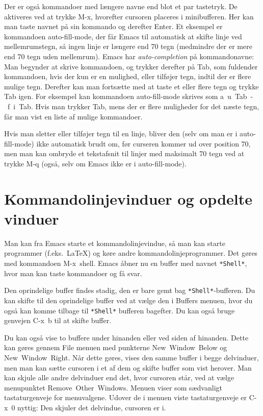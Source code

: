 \documentclass[a4paper]{article}
\begin{document}
Der er også kommandoer med længere navne end blot et par tastetryk.
De aktiveres ved at trykke \textsf{M-x}, hvorefter cursoren placeres i
minibufferen.  Her kan man taste navnet på sin kommando og derefter
\textsf{Enter}.  Et eksempel er kommandoen \textsf{auto-fill-mode},
der får Emacs til automatisk at skifte linje ved mellemrumstegn, så
ingen linje er længere end 70 tegn (medmindre der er mere end 70 tegn
uden mellemrum).  Emacs har \emph{auto-completion} på kommandonavne:
Man begynder at skrive kommandoen, og trykker derefter på
\textsf{Tab}, som fuldender kommandoen, hvis der kun er en mulighed,
eller tilføjer tegn, indtil der er flere mulige tegn.  Derefter kan
man fortsætte med at taste et eller flere tegn og trykke \textsf{Tab}
igen.  For eksempel kan kommandoen \textsf{auto-fill-mode} skrives som
\textsf{a~u~Tab~-~f~i~Tab}.  Hvis man trykker \textsf{Tab}, mens der
er flere muligheder for det næste tegn, får man vist en liste af
mulige kommandoer.

Hvis man sletter eller tilføjer tegn til en linje, bliver den (selv om
man er i auto-fill-mode) ikke automatisk brudt om, før curseren kommer
ud over position 70, men man kan ombryde et tekstafsnit til linjer med
maksimalt 70 tegn ved at trykke \textsf{M-q} (også, selv om Emacs ikke
er i auto-fill-mode).

\section{Kommandolinjevinduer og opdelte vinduer}

Man kan fra Emacs starte et kommandolinjevindue, så man kan starte
programmer (f.eks.\ \LaTeX) og køre andre kommandolinjeprogrammer.
Det gøres med kommandoen \textsf{M-x~shell}.  Emacs åbner nu en buffer
med navnet \texttt{*Shell*}, hvor man kan taste kommandoer og få svar.

Den oprindelige buffer findes stadig, den er bare gemt bag
\texttt{*Shell*}-bufferen. Du kan skifte til den oprindelige buffer
ved at vælge den i \textsf{Buffers} menuen, hvor du også kan komme
tilbage til \texttt{*Shell*} bufferen bagefter.  Du kan også bruge
genvejen \textsf{C-x~b} til at skifte buffer.

Du kan også vise to buffere under hinanden eller ved siden af
hinanden.  Dette kan gøres gennem \textsf{File} menuen med punkterne
\textsf{New~Window~Below} og \textsf{New~Window~Right}.  Når dette
gøres, vises den samme buffer i begge delvinduer, men man kan sætte
cursoren i et af dem og skifte buffer som vist herover.  Man kan skjule
alle andre delvinduer end det, hvor cursoren står, ved at vælge
menupunktet \textsf{Remove~Other~Windows}.  Menuen viser som
sædvanligt tastaturgenveje for menu\-valgene. Udover de i menuen viste
tastaturgenveje er \textsf{C-x~0} nyttig: Den skjuler det delvindue,
cursoren er i.
\end{document}
